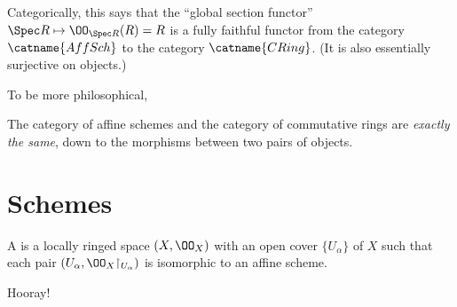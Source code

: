 \documentclass[11pt]{scrreprt}
\begin{document}
\begin{remark}
	Categorically, this says that the ``global section functor''
	$\Spec R \mapsto \OO_{\Spec R}(R) = R$ is a fully faithful functor
	from the category $\catname{AffSch}$ to the category $\catname{CRing}$.
	(It is also essentially surjective on objects.)
\end{remark}
To be more philosophical,
\begin{moral}
	The category of affine schemes and the
	category of commutative rings are \emph{exactly the same},
	down to the morphisms between two pairs of objects.
\end{moral}

\section{Schemes}
\begin{definition}
	A  is a locally ringed space $(X, \OO_X)$
	with an open cover $\{U_\alpha\}$ of $X$
	such that each pair $(U_\alpha, \OO_X \restrict{U_\alpha})$
	is isomorphic to an affine scheme.
\end{definition}
Hooray!
\end{document}
